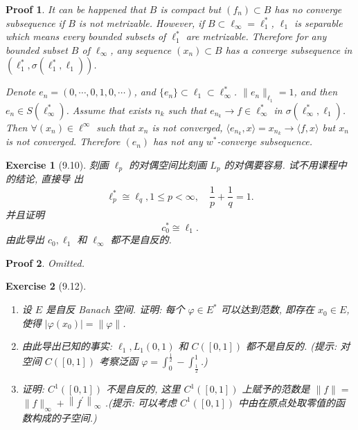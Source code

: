 \documentclass[hyperref,UTF8]{ctexart}
\newtheorem{ex}{Exercise}[section]
\newtheorem{pf}{Proof}[section]
\newcommand{\lrangle}[2]{\langle #1, #2 \rangle}
\begin{document}
\begin{pf}
    It can be happened that $B$ is compact but $(f_n)\subset B$ has no converge subsequence if $B$ is not metrizable. However, if $B\subset \ell_\infty = \ell_1^*$, $\ell_1$ is separable which means every bounded subsets of $\ell_1^*$ are metrizable. Therefore for any bounded subset $B$ of $\ell_\infty$, any sequence $(x_n)\subset B$ has a converge subsequence in $(\ell_1^*, \sigma(\ell_1^*, \ell_1))$.  

    Denote $e_n = (0, \cdots, 0, 1, 0, \cdots)$, and $\{e_n\}\subset \ell_1\subset \ell_\infty^*$. $\|e_n\|_{\ell_1} = 1$, and then $e_n\in S(\ell_\infty^*)$. Assume that exists $n_k$ such that $e_{n_k}\to f\in \ell_\infty^*$ in $\sigma(\ell_\infty^*, \ell_1)$. Then $\forall (x_n)\in \ell^\infty$ such that $x_n$ is not converged, $\lrangle{e_{n_k}}{x} = x_{n_k}\to \lrangle{f}{x}$ but $x_n$ is not converged. Therefore $(e_{n})$ has not any $w^*$-converge subsequence. 
\end{pf}

\begin{ex}[9.10]
刻画 $\ell_{p}$ 的对偶空间比刻画 $L_{p}$ 的对偶要容易. 试不用课程中的结论, 直接导 出
$$
\ell_{p}^{*} \cong \ell_{q}, 1 \leqslant p<\infty, \quad \frac{1}{p}+\frac{1}{q}=1 .
$$
并且证明
$$
c_{0}^{*} \cong \ell_{1} .
$$
由此导出 $c_{0}, \ell_{1}$ 和 $\ell_{\infty}$ 都不是自反的.
\end{ex}

\begin{pf}
    Omitted. 
\end{pf}

\begin{ex}[9.12]
    \begin{enumerate}
        \item 设 $E$ 是自反 Banach 空间. 证明: 每个 $\varphi \in E^{*}$ 可以达到范数, 即存在 $x_{0} \in E$, 使得 $\left|\varphi\left(x_{0}\right)\right|=\|\varphi\|$.
        \item 由此导出已知的事实: $\ell_{1}, L_{1}(0,1)$ 和 $C([0,1])$ 都不是自反的. (提示: 对空间 $C([0,1])$ 考察泛函 $\varphi=\int_{0}^{\frac{1}{2}}-\int_{\frac{1}{2}}^{1}$.)
        \item 证明: $C^{1}([0,1])$ 不是自反的, 这里 $C^{1}([0,1])$ 上赋予的范数是 $\|f\|=$ $\|f\|_{\infty}+\left\|f^{\prime}\right\|_{\infty}$ .(提示: 可以考虑 $C^{1}([0,1])$ 中由在原点处取零值的函数构成的子空间.)
    \end{enumerate}
\end{ex}
\end{document}
